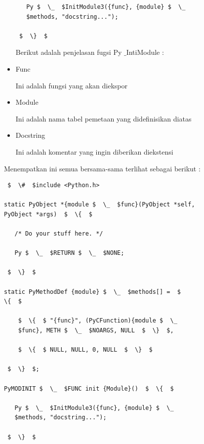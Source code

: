 \begin{itemize}
\begin{verbatim}
   Py $  \_  $InitModule3({func}, {module} $  \_ 
   $methods, "docstring..."); 

 $  \}  $ 
\end{verbatim}

\vspace{12pt}
Berikut adalah penjelasan fugsi Py $  \_  $IntiModule : 
\item Func  

Ini adalah fungsi yang akan diekspor 
\item Module 

Ini adalah nama tabel pemetaan yang didefinisikan diatas 
\item Docstring

Ini adalah komentar yang ingin diberikan diekstensi 
\end{itemize}

\vspace{12pt}
Menempatkan ini semua bersama-sama terlihat sebagai berikut : 
\begin{verbatim}
 $  \#  $include <Python.h>

static PyObject *{module $  \_  $func}(PyObject *self, 
PyObject *args)  $  \{  $ 

   /* Do your stuff here. */ 

   Py $  \_  $RETURN $  \_  $NONE; 

 $  \}  $ 
 
static PyMethodDef {module} $  \_  $methods[] =  $ 
\{  $ 

    $  \{  $ "{func}", (PyCFunction){module $  \_ 
    $func}, METH $  \_  $NOARGS, NULL  $  \}  $, 
 
    $  \{  $ NULL, NULL, 0, NULL  $  \}  $ 

 $  \}  $; 

PyMODINIT $  \_  $FUNC init {Module}()  $  \{  $ 
 
   Py $  \_  $InitModule3({func}, {module} $  \_ 
   $methods, "docstring..."); 

 $  \}  $ 
\end{verbatim}

